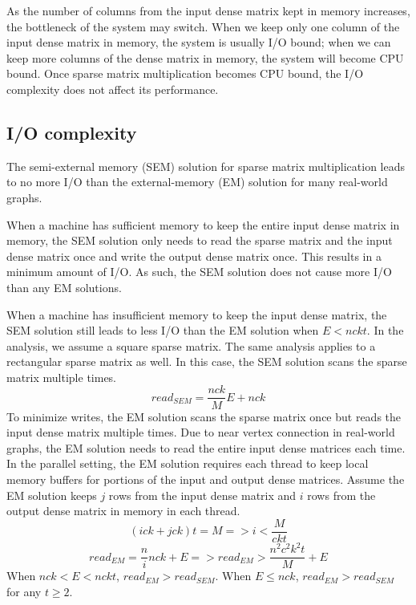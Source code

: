 As the number of columns from the input dense matrix kept in memory increases,
the bottleneck of the system
may switch. When we keep only one column of the input dense matrix in memory,
the system is usually I/O bound; when we can keep more columns of the dense matrix
in memory, the system will become CPU bound. Once sparse matrix multiplication
becomes CPU bound, the I/O complexity does not affect its performance.


\subsection{I/O complexity}
The semi-external memory (SEM) solution for sparse matrix multiplication leads
to no more I/O than the external-memory (EM) solution for many real-world graphs.

When a machine has sufficient memory to keep the entire input dense matrix
in memory, the SEM solution only needs to read the sparse matrix and the input
dense matrix once and write the output dense matrix once. This results in
a minimum amount of I/O. As such, the SEM solution does not cause more I/O
than any EM solutions.

When a machine has insufficient memory to keep the input dense matrix, the SEM
solution still leads to less I/O than the EM solution when $E < n c k t$.
In the analysis, we assume a square sparse matrix. The same analysis applies
to a rectangular sparse matrix as well.
In this case, the SEM solution scans the sparse matrix multiple times.
\begin{equation*}
read_{SEM} = \frac{n c k}{M} E + n c k
\end{equation*}
To minimize writes, the EM solution
scans the sparse matrix once but reads the input dense matrix multiple times.
Due to near vertex connection in real-world graphs, the EM solution needs to
read the entire input dense matrices each time. In the parallel setting,
the EM solution requires each thread to keep local memory buffers for portions
of the input and output dense matrices. Assume the EM solution keeps $j$ rows
from the input dense matrix and $i$ rows from the output dense matrix in memory
in each thread.
\begin{equation*}
(i c k + j c k) t = M => i < \frac{M}{c k t}
\end{equation*}
\begin{equation*}
read_{EM} = \frac{n}{i} n c k + E =>  read_{EM} > \frac{n^2 c^2 k^2 t}{M} + E
\end{equation*}
When $n c k < E < n c k t$, $read_{EM} > read_{SEM}$.
When $E \leq n c k$, $read_{EM} > read_{SEM}$ for any $t \geq 2$.

